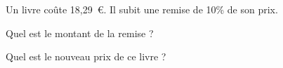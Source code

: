 Un livre coûte 18,29~\textgreek{\euro}. Il subit une remise de 10\% de son prix.
\begin{myenumerate}
\item Quel est le montant de la remise ?
\item Quel est le nouveau prix de ce livre ?
\end{myenumerate}